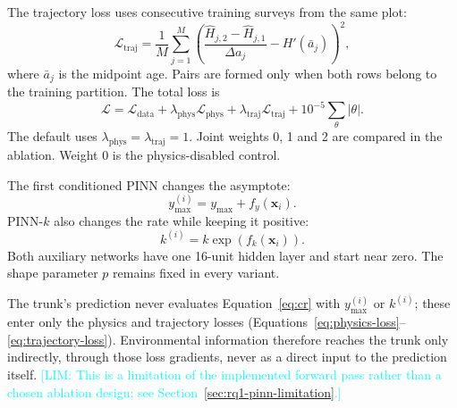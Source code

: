 \documentclass[logo,msc,ai]{infthesis}           %
\newcommand{\limit}[1]{\textcolor{cyan}{[LIM: #1]}}
\begin{document}
The trajectory loss uses consecutive training surveys from the same plot:
\begin{equation}
\mathcal{L}_{\mathrm{traj}}=\frac{1}{M}\sum_{j=1}^{M}
\left(\frac{\hat H_{j,2}-\hat H_{j,1}}{\Delta a_j}-H'(\bar a_j)\right)^2,
\label{eq:trajectory-loss}
\end{equation}
where $\bar a_j$ is the midpoint age. Pairs are formed only when both rows belong to the training
partition. The total loss is
\begin{equation}
\mathcal{L}=\mathcal{L}_{\mathrm{data}}+
\lambda_{\mathrm{phys}}\mathcal{L}_{\mathrm{phys}}+
\lambda_{\mathrm{traj}}\mathcal{L}_{\mathrm{traj}}+
10^{-5}\sum_{\theta}|\theta|.
\label{eq:total-loss}
\end{equation}
The default uses $\lambda_{\mathrm{phys}}=\lambda_{\mathrm{traj}}=1$. Joint weights 0, 1 and 2
are compared in the ablation. Weight 0 is the physics-disabled control.

The first conditioned PINN changes the asymptote:
\begin{equation}
y_{\max}^{(i)}=y_{\max}+f_y(\mathbf{x}_i).
\label{eq:ymax-adjust}
\end{equation}
PINN-$k$ also changes the rate while keeping it positive:
\begin{equation}
k^{(i)}=k\exp\!\left(f_k(\mathbf{x}_i)\right).
\label{eq:k-adjust}
\end{equation}
Both auxiliary networks have one 16-unit hidden layer and start near zero. The shape parameter
$p$ remains fixed in every variant.

The trunk's prediction never evaluates Equation~\ref{eq:cr} with $y_{\max}^{(i)}$ or $k^{(i)}$;
these enter only the physics and trajectory losses (Equations~\ref{eq:physics-loss}--
\ref{eq:trajectory-loss}). Environmental information therefore reaches the trunk only indirectly,
through those loss gradients, never as a direct input to the prediction itself. \limit{This is a
limitation of the implemented forward pass rather than a chosen ablation design; see
Section~\ref{sec:rq1-pinn-limitation}.}
\end{document}
